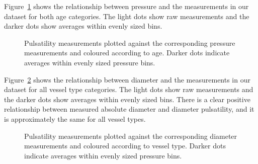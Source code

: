 \documentclass[
  letterpaper,
  DIV=11,
  numbers=noendperiod,
  oneside]{scrartcl}
\theoremstyle{plain}
\theoremstyle{remark}
\begin{document}
Figure~\ref{fig-pressure-data} shows the relationship between pressure
and the measurements in our dataset for both age categories. The light
dots show raw measurements and the darker dots show averages within
evenly sized bins.

\begin{figure}


\caption{\label{fig-pressure-data}Pulsatility measurements plotted
against the corresponding pressure measurements and coloured according
to age. Darker dots indicate averages within evenly sized pressure
bins.}

\end{figure}%

Figure~\ref{fig-diameter-data} shows the relationship between diameter
and the measurements in our dataset for all vessel type categories. The
light dots show raw measurements and the darker dots show averages
within evenly sized bins. There is a clear positive relationship between
measured absolute diameter and diameter pulsatility, and it is
approximately the same for all vessel types.

\begin{figure}


\caption{\label{fig-diameter-data}Pulsatility measurements plotted
against the corresponding diameter measurements and coloured according
to vessel type. Darker dots indicate averages within evenly sized
pressure bins.}

\end{figure}%
\end{document}
